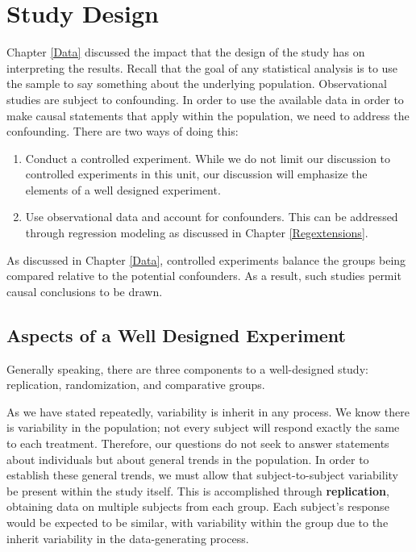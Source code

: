 \documentclass[]{book}
\providecommand{\tightlist}{%
  \setlength{\itemsep}{0pt}\setlength{\parskip}{0pt}}
\theoremstyle{plain}
\theoremstyle{mydefn}
\theoremstyle{myexmpl}
\theoremstyle{remark}
\begin{document}
\chapter{Study Design}\label{ANOVAdata}

Chapter \ref{Data} discussed the impact that the design of the study has
on interpreting the results. Recall that the goal of any statistical
analysis is to use the sample to say something about the underlying
population. Observational studies are subject to confounding. In order
to use the available data in order to make causal statements that apply
within the population, we need to address the confounding. There are two
ways of doing this:

\begin{enumerate}
\def\labelenumi{\arabic{enumi}.}
\tightlist
\item
  Conduct a controlled experiment. While we do not limit our discussion
  to controlled experiments in this unit, our discussion will emphasize
  the elements of a well designed experiment.\\
\item
  Use observational data and account for confounders. This can be
  addressed through regression modeling as discussed in Chapter
  \ref{Regextensions}.
\end{enumerate}

As discussed in Chapter \ref{Data}, controlled experiments balance the
groups being compared relative to the potential confounders. As a
result, such studies permit causal conclusions to be drawn.

\section{Aspects of a Well Designed
Experiment}\label{aspects-of-a-well-designed-experiment}

Generally speaking, there are three components to a well-designed study:
replication, randomization, and comparative groups.

As we have stated repeatedly, variability is inherit in any process. We
know there is variability in the population; not every subject will
respond exactly the same to each treatment. Therefore, our questions do
not seek to answer statements about individuals but about general trends
in the population. In order to establish these general trends, we must
allow that subject-to-subject variability be present within the study
itself. This is accomplished through \textbf{replication}, obtaining
data on multiple subjects from each group. Each subject's response would
be expected to be similar, with variability within the group due to the
inherit variability in the data-generating process.
\end{document}
